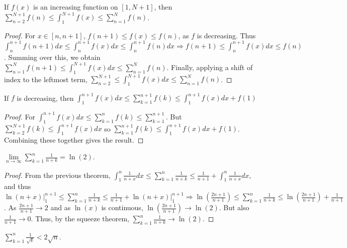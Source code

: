 \documentclass[crop=false,class=book,oneside]{standalone}
\begin{document}
            \begin{theorem}
            If $f(x)$ is an increasing function on $[1,N+1]$, then $\sum_{n=2}^{N+1} f(n) \leq \int_{1}^{N+1} f(x) \leq \sum_{n=1}^{N} f(n)$.
            \end{theorem}
            \begin{proof}
            For $x\in [n,n+1]$, $f(n+1)\leq f(x)\leq f(n)$, as $f$ is decreasing. Thus $\int_{n}^{n+1} f(n+1)dx \leq \int_{n}^{n+1} f(x) dx \leq \int_{n}^{n+1} f(n)dx \Rightarrow f(n+1) \leq \int_{n}^{n+1}f(x)dx \leq f(n)$. Summing over this, we obtain $\sum_{n=1}^{N} f(n+1) \leq \int_{1}^{N+1} f(x) dx \leq \sum_{n=1}^{N} f(n)$. Finally, applying a shift of index to the leftmost term, $\sum_{n=2}^{N+1} \leq \int_{1}^{N+1}f(x)dx \leq \sum_{n=1}^{N} f(n)$. 
            \end{proof}
            \begin{corollary}
            If $f$ is decreasing, then $\int_{1}^{n+1} f(x)dx \leq \sum_{k=1}^{n+1} f(k) \leq \int_{1}^{n+1} f(x)dx + f(1)$
            \end{corollary}
            \begin{proof}
            For $\int_{1}^{n+1}f(x) dx \leq \sum_{k=1}^{n}f(k)\leq \sum_{k=1}^{n+1}$. But $\sum_{k=2}^{N+1} f(k) \leq \int_{1}^{n+1}f(x)dx$ so $\sum_{k=1}^{n+1}f(k) \leq \int_{1}^{n+1}f(x)dx +f(1)$. Combining these together gives the result.
            \end{proof}
            \begin{theorem}
            $\underset{n\rightarrow \infty}\lim \sum_{k=1}^{n} \frac{1}{n+k} = \ln(2)$.
            \end{theorem}
            \begin{proof}
            From the previous theorem, $\int_{1}^{n} \frac{1}{n+x} dx \leq \sum_{k=1}^{n} \frac{1}{n+k} \leq \frac{1}{n+1} + \int_{1}^{n} \frac{1}{n+x}dx$, and thus $\ln(n+x)\big|_{1}^{n+1} \leq \sum_{k=1}^{n} \frac{1}{n+k}\leq \frac{1}{n+1}+\ln(n+x)\big|_{1}^{n+1}\Rightarrow \ln(\frac{2n+1}{n+1})\leq \sum_{k=1}^{n} \frac{1}{n+k} \leq \ln(\frac{2n+1}{n+1})+\frac{1}{n+1}$. As $\frac{2n+1}{n+1}\rightarrow 2$ and as $\ln(x)$ is continuous, $\ln(\frac{2n+1}{n+1})\rightarrow \ln(2)$. But also $\frac{1}{n+1}\rightarrow 0$. Thus, by the squeeze theorem, $\sum_{k=1}^{n} \frac{1}{n+k} \rightarrow \ln(2)$.
            \end{proof}
            \begin{corollary}
            $\sum_{k=1}^{n}\frac{1}{\sqrt{k}}< 2\sqrt{n}$.
            \end{corollary}
\end{document}
